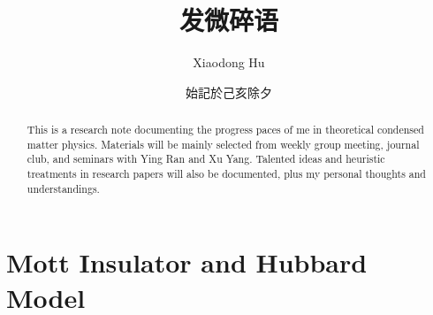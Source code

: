 \documentclass[10pt,nofootinbib]{revtex4}
\begin{document}
\title{发微碎语}%

\author{Xiaodong Hu}

\date{始記於己亥除夕}


\begin{abstract}
	This is a research note documenting the progress paces of me in theoretical condensed matter physics. Materials will be mainly selected from weekly group meeting, journal club, and seminars with Ying Ran and Xu Yang. Talented ideas and heuristic treatments in research papers will also be documented, plus my personal thoughts and understandings. 
\end{abstract}
\maketitle
\tableofcontents

\section{Mott Insulator and Hubbard Model}
\end{document}
